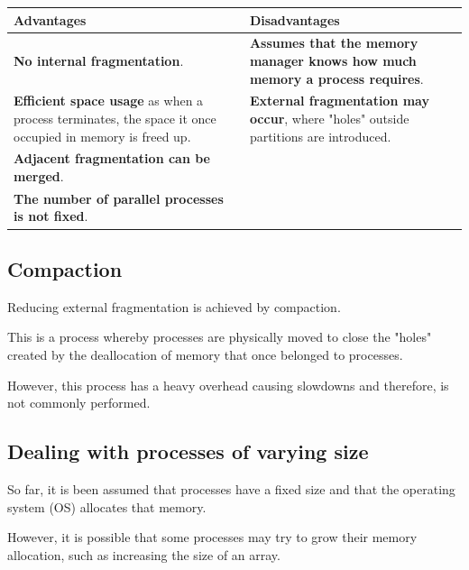 \documentclass[a4paper]{systems-software}
\begin{document}
\begin{longtabu} to \textwidth {| X[1,l] | X[1,l] |}
    \hline
    \textbf{Advantages} & \textbf{Disadvantages}
	\\ \hline
	\textbf{No internal fragmentation}. & \textbf{Assumes that the memory manager knows how much memory a process requires}.
	\\ \hline
	\textbf{Efficient space usage} as when a process terminates, the space it once occupied in memory is freed up. & \textbf{External fragmentation may occur}, where "holes" outside partitions are introduced.
	\\ \hline
	\textbf{Adjacent fragmentation can be merged}. &
	\\ \hline
	\textbf{The number of parallel processes is not fixed}. &
	\\ \hline
\end{longtabu}


\subsection*{Compaction}

Reducing external fragmentation is achieved by compaction.

This is a process whereby processes are physically moved to close the "holes" created by the deallocation of memory that once belonged to processes.

However, this process has a heavy overhead causing slowdowns and therefore, is not commonly performed.


\newpage

\subsection*{Dealing with processes of varying size}

So far, it is been assumed that processes have a fixed size and that the operating system (OS) allocates that memory.

However, it is possible that some processes may try to grow their memory allocation, such as increasing the size of an array.
\end{document}
